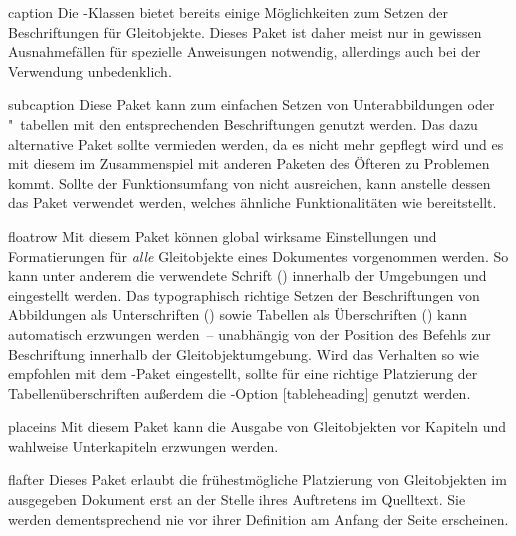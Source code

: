 \begin{packages}
\item[caption]
  Die \KOMAScript-Klassen bietet bereits einige Möglichkeiten zum Setzen der 
  Beschriftungen für Gleitobjekte. Dieses Paket ist daher meist nur in gewissen
  Ausnahmefällen für spezielle Anweisungen notwendig, allerdings auch bei der 
  Verwendung unbedenklich.
\item[subcaption]
  Diese Paket kann zum einfachen Setzen von Unterabbildungen oder "~tabellen 
  mit den entsprechenden Beschriftungen genutzt werden. Das dazu alternative 
  Paket  sollte vermieden werden, da es nicht mehr gepflegt 
  wird und es mit diesem im Zusammenspiel mit anderen Paketen des Öfteren zu 
  Problemen kommt. Sollte der Funktionsumfang von  nicht 
  ausreichen, kann anstelle dessen das Paket  verwendet 
  werden, welches ähnliche Funktionalitäten wie  bereitstellt.
\item[floatrow]
  Mit diesem Paket können global wirksame Einstellungen und Formatierungen für 
  \emph{alle} Gleitobjekte eines Dokumentes vorgenommen werden. So kann unter 
  anderem die verwendete Schrift () 
  innerhalb der Umgebungen  und  
  eingestellt werden. Das typographisch richtige Setzen der Beschriftungen von 
  Abbildungen als Unterschriften 
  ()
  sowie Tabellen als Überschriften 
  ()
  kann automatisch erzwungen werden~-- unabhängig von der Position des Befehls 
  zur Beschriftung  innerhalb der Gleitobjektumgebung. Wird das 
  Verhalten so wie empfohlen mit dem -Paket eingestellt, 
  sollte für eine richtige Platzierung der Tabellenüberschriften außerdem die 
  \KOMAScript-Option [tableheading] genutzt werden.
\item[placeins]
  Mit diesem Paket kann die Ausgabe von Gleitobjekten vor Kapiteln und wahlweise
  Unterkapiteln erzwungen werden.
\item[flafter]
  Dieses Paket erlaubt die frühestmögliche Platzierung von Gleitobjekten im 
  ausgegeben Dokument erst an der Stelle ihres Auftretens im Quelltext. Sie 
  werden dementsprechend nie vor ihrer Definition am Anfang der Seite 
  erscheinen.
\end{packages}

